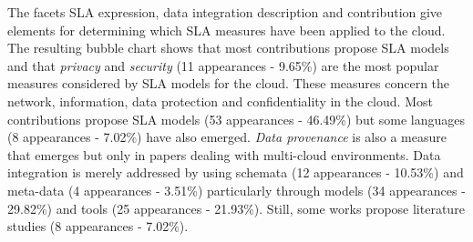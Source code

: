 The facets SLA expression, data integration description and contribution give elements for determining which SLA measures have been applied to the cloud. 
The resulting bubble chart shows that most contributions propose SLA models and that  \textit{privacy}
and \textit{security} (11 appearances - 9.65\%) are the most popular measures considered by SLA models for the cloud. These measures concern the network, information, data protection and confidentiality in the cloud. Most contributions propose SLA models (53 appearances - 46.49\%)  but some languages (8 appearances - 7.02\%) have also emerged. {\em Data provenance} is also a measure that emerges but only in papers dealing with multi-cloud environments. Data integration is merely addressed by using schemata (12 appearances - 10.53\%)  and meta-data (4 appearances - 3.51\%) particularly through models (34 appearances - 29.82\%) and tools (25 appearances - 21.93\%). Still, some works propose literature studies (8 appearances - 7.02\%).
 



